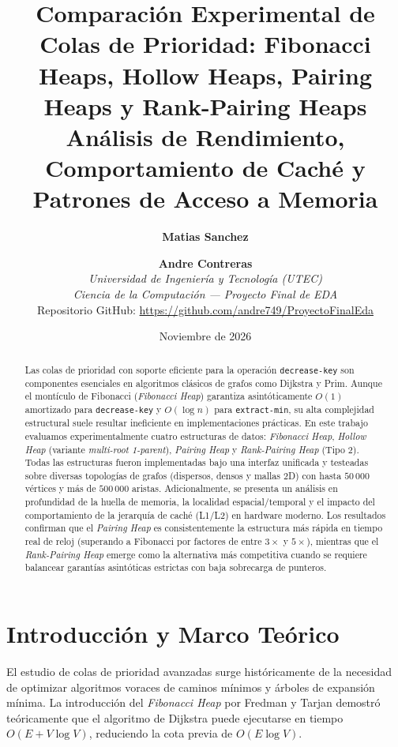 \documentclass[11pt,a4paper]{article}
\title{\textbf{Comparación Experimental de Colas de Prioridad: Fibonacci Heaps, Hollow Heaps, Pairing Heaps y Rank-Pairing Heaps}\\[0.3cm]
\large Análisis de Rendimiento, Comportamiento de Caché y Patrones de Acceso a Memoria}
\author{
    \textbf{Matias Sanchez} \and \textbf{Andre Contreras}\\[0.2cm]
    \textit{Universidad de Ingeniería y Tecnología (UTEC)}\\
    \textit{Ciencia de la Computación --- Proyecto Final de EDA}\\[0.25cm]
    \small Repositorio GitHub: \url{https://github.com/andre749/ProyectoFinalEda}
}
\date{Noviembre de 2026}
\begin{document}
\maketitle

\begin{abstract}
Las colas de prioridad con soporte eficiente para la operación \texttt{decrease-key} son componentes esenciales en algoritmos clásicos de grafos como Dijkstra y Prim. Aunque el montículo de Fibonacci (\textit{Fibonacci Heap}) garantiza asintóticamente $O(1)$ amortizado para \texttt{decrease-key} y $O(\log n)$ para \texttt{extract-min}, su alta complejidad estructural suele resultar ineficiente en implementaciones prácticas. En este trabajo evaluamos experimentalmente cuatro estructuras de datos: \textit{Fibonacci Heap}, \textit{Hollow Heap} (variante \textit{multi-root 1-parent}), \textit{Pairing Heap} y \textit{Rank-Pairing Heap} (Tipo 2). Todas las estructuras fueron implementadas bajo una interfaz unificada y testeadas sobre diversas topologías de grafos (dispersos, densos y mallas 2D) con hasta $50\,000$ vértices y más de $500\,000$ aristas. Adicionalmente, se presenta un análisis en profundidad de la huella de memoria, la localidad espacial/temporal y el impacto del comportamiento de la jerarquía de caché (L1/L2) en hardware moderno. Los resultados confirman que el \textit{Pairing Heap} es consistentemente la estructura más rápida en tiempo real de reloj (superando a Fibonacci por factores de entre $3\times$ y $5\times$), mientras que el \textit{Rank-Pairing Heap} emerge como la alternativa más competitiva cuando se requiere balancear garantías asintóticas estrictas con baja sobrecarga de punteros.
\end{abstract}

\vspace{0.5cm}
\tableofcontents
\newpage

\section{Introducción y Marco Teórico}

El estudio de colas de prioridad avanzadas surge históricamente de la necesidad de optimizar algoritmos voraces de caminos mínimos y árboles de expansión mínima. La introducción del \textit{Fibonacci Heap} por Fredman y Tarjan \cite{fredman1987fibonacci} demostró teóricamente que el algoritmo de Dijkstra puede ejecutarse en tiempo $O(E + V \log V)$, reduciendo la cota previa de $O(E \log V)$.
\end{document}
